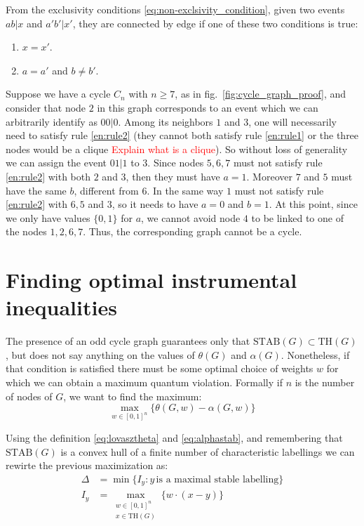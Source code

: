\documentclass[letterpaper]{article}
\newcommand{\STAB}{\mathrm{STAB}}
\renewcommand{\TH}{\mathrm{TH}}
\begin{document}
From the exclusivity conditions \eqref{eq:non-exclsivity_condition},
given two events $ab|x$ and $a'b'|x'$, they are connected by edge if one of these two conditions is true:
\begin{enumerate}
    \item $x=x'$.\label{en:rule1}
    \item $a=a'$ and $b \neq b'$.\label{en:rule2}
\end{enumerate}
Suppose we have a cycle $C_n$ with $n \ge 7$, as in fig.~\ref{fig:cycle_graph_proof},
and consider that node $2$ in this graph corresponds to an event which we can arbitrarily identify as $00|0$.
Among its neighbors $1$ and $3$, one will necessarily need to satisfy rule \ref{en:rule2} (they cannot both satisfy rule \ref{en:rule1} or the three nodes would be a clique \textcolor{red}{Explain what is a clique}).
So without loss of generality we can assign the event $01|1$ to $3$.
Since nodes $5,6,7$ must not satisfy rule \ref{en:rule2} with both $2$ and $3$, then they must have $a = 1$.
Moreover $7$ and $5$ must have the same $b$, different from $6$. In the same way $1$ must not satisfy rule \ref{en:rule2} with $6,5$ and $3$, so it
needs to have $a=0$ and $b=1$. At this point, since we only have values $\{0,1\}$ for $a$, we cannot avoid node $4$ to be linked to one of the nodes $1,2,6,7$. Thus, the corresponding graph cannot be a cycle.


\section{Finding optimal instrumental inequalities}
The presence of an odd cycle graph guarantees only that $\STAB(G) \subset
\TH(G)$, but does not say anything on the values of $\theta(G)$ and $\alpha(G)$.
Nonetheless, if that condition is satisfied there must be some optimal choice of
weights $w$ for which we can obtain a maximum quantum violation.
Formally if $n$ is the number of nodes of $G$, we want to find the maximum:
\begin{equation}
    \max_{w \in [0,1]^n} \{\theta(G,w) - \alpha(G,w)\}
    \label{eq:maxonw}
\end{equation}

Using the definition \eqref{eq:lovasztheta} and \eqref{eq:alphastab}, and
remembering that $\STAB(G)$ is a convex hull of a finite number of
characteristic labellings we can rewirte the previous maximization as:
\begin{align}
    \Delta &= \min \{I_y : y \, \text{is a maximal stable labelling}\}
    \label{eq:maximize_w_delta}\\
    I_y &= \max_{\substack{w \in [0,1]^n\\x \in \TH(G)}} \{w\cdot (x - y)\}
    \label{eq:maximize_w_I}
\end{align}
\end{document}
